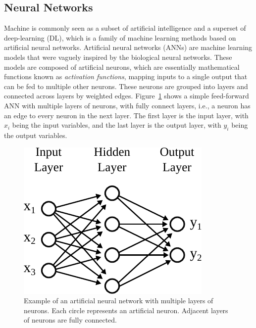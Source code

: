 
%

\subsection{Neural Networks}

Machine is commonly seen as a subset of artificial intelligence and a superset of deep-learning (DL), which is a family of machine learning methods based on artificial neural networks.
Artificial neural networks (ANNs) are machine learning models that were vaguely inspired by the biological neural networks.
These models are composed of artificial neurons, which are essentially mathematical functions known as \textit{activation functions}, mapping inputs to a single output that can be fed to multiple other neurons.
These neurons are grouped into layers and connected across layers by weighted edges.
Figure~\ref{fig:ML-feed-forward-network} shows a simple feed-forward ANN with multiple layers of neurons, with fully connect layers, i.e., a neuron has an edge to every neuron in the next layer.
The first layer is the input layer, with $x_i$ being the input variables, and the last layer is the output layer, with $y_i$ being the output variables.

\begin{figure}[h]
  \centering
  \includegraphics[scale=0.85]{src/background/figs/ML-feed-forward-network.pdf}
  \caption{Example of an artificial neural network with multiple layers of neurons. Each circle represents an artificial neuron. Adjacent layers of neurons are fully connected.}
  \label{fig:ML-feed-forward-network}
\end{figure}

